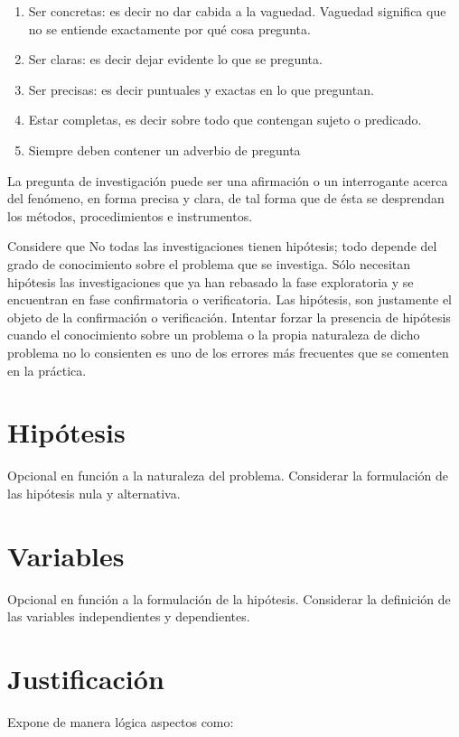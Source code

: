 \begin{enumerate}
    \item Ser concretas: es decir no dar cabida a la vaguedad. Vaguedad significa que no se entiende exactamente por qué cosa pregunta.
    \item Ser claras: es decir dejar evidente lo que se pregunta.
    \item Ser precisas: es decir puntuales y exactas en lo que preguntan.
    \item Estar completas, es decir sobre todo que contengan sujeto o predicado.
    \item Siempre deben contener un adverbio de pregunta
\end{enumerate}

La pregunta de investigación puede ser una afirmación o un interrogante acerca del fenómeno, en forma precisa y clara, de tal forma que de ésta se desprendan los métodos, procedimientos e instrumentos.\newline

Considere que No todas las investigaciones tienen hipótesis; todo depende del grado de conocimiento sobre el problema que se investiga. Sólo necesitan hipótesis las investigaciones que ya han rebasado la fase exploratoria y se encuentran en fase confirmatoria o verificatoria. Las hipótesis, son justamente el objeto de la confirmación o verificación. Intentar forzar la presencia de hipótesis cuando el conocimiento sobre un problema o la propia naturaleza de dicho problema no lo consienten es uno de los errores más frecuentes que se comenten en la práctica.

\section{Hipótesis}
Opcional en función a la naturaleza del problema. Considerar la formulación de las hipótesis nula y alternativa.

\section{Variables}
Opcional en función a la formulación de la hipótesis. Considerar la definición de las variables independientes y dependientes.

\section{Justificación}
Expone de manera lógica aspectos como:

